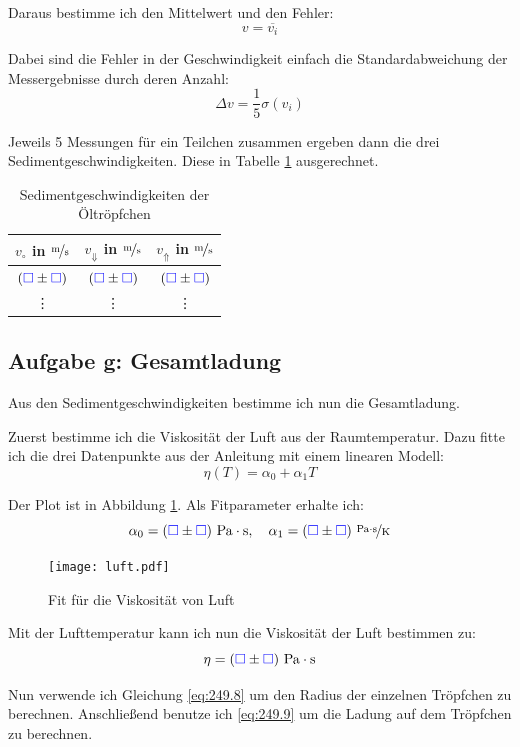 \documentclass[11pt]{article}
\newcommand{\emesswert}{\left(\messwert \pm \messwert \right)}
\newcommand{\messwert}{\textcolor{blue}{\square}}
\begin{document}
Daraus bestimme ich den Mittelwert und den Fehler:
\[ v = \overline{v_i}  \]

Dabei sind die Fehler in der Geschwindigkeit einfach die Standardabweichung der
Messergebnisse durch deren Anzahl:
\[ \Delta v = \frac 15 \sigma \left( v_i \right) \]

Jeweils 5 Messungen für ein Teilchen zusammen ergeben dann die drei
Sedimentgeschwindigkeiten. Diese in Tabelle \ref{table:sediment2} ausgerechnet.

\begin{table}[h!]
	\centering

	\begin{tabular}{ccc}
		$v_\circ$ in $\unitfrac ms$ & $v_\Downarrow$ in $\unitfrac ms$ & $v_\Uparrow$ in $\unitfrac ms$ \\
		\hline
		$\emesswert$ & $\emesswert$ & $\emesswert$ \\
			   \vdots & \vdots & \vdots
	\end{tabular}

	\caption{Sedimentgeschwindigkeiten der Öltröpfchen}
	\label{table:sediment2}
\end{table}

\subsection{Aufgabe g: Gesamtladung}

Aus den Sedimentgeschwindigkeiten bestimme ich nun die Gesamtladung.

Zuerst bestimme ich die Viskosität der Luft aus der Raumtemperatur. Dazu fitte
ich die drei Datenpunkte aus der Anleitung mit einem linearen Modell:
\[ \eta(T) = \alpha_0 + \alpha_1 T \]

Der Plot ist in Abbildung \ref{fig:luft.pdf}. Als Fitparameter erhalte ich:
\[
	\alpha_0 = \unit[\emesswert]{Pa \cdot s}
	, \quad
	\alpha_1 = \unitfrac[\emesswert]{Pa \cdot s}K
\]

\begin{figure}[h!]
	\centering
	\texttt{[image: luft.pdf]}
	\caption{Fit für die Viskosität von Luft}
	\label{fig:luft.pdf}
\end{figure}

Mit der Lufttemperatur kann ich nun die Viskosität der Luft bestimmen zu:
\[ \eta = \unit[\emesswert]{Pa \cdot s} \]

Nun verwende ich Gleichung \eqref{eq:249.8} um den Radius der einzelnen
Tröpfchen zu berechnen. Anschließend benutze ich \eqref{eq:249.9} um die Ladung
auf dem Tröpfchen zu berechnen.
\end{document}
